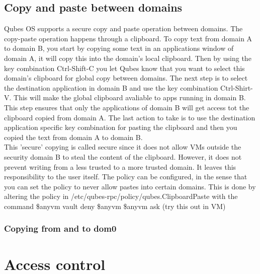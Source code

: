 \documentclass[runningheads,a4paper]{article}
\begin{document}
\subsection{Copy and paste between domains}
Qubes OS supports a secure copy and paste operation between domains. The copy-paste operation happens through a clipboard. To copy text from domain A to domain B, you start by copying some text in an applications window of domain A, it will copy this into the domain's local clipboard. Then by using the key combination Ctrl-Shift-C you let Qubes know that you want to select this domain's clipboard for global copy between domains. The next step is to select the destination application in domain B and use the key combination Ctrl-Shirt-V. This will make the global clipboard avaliable to apps running in domain B. This step ensures that only the applications of domain B will get access tot the clipboard copied from domain A. The last action to take is to use the destination application specific key combination for pasting the clipboard and then you copied the text from domain A to domain B.\\
This 'secure' copying is called secure since it does not allow VMs outside the security domain B to steal the content of the clipboard. However, it does not prevent writing from a less trusted to a more trusted domain. It leaves this responsibility to the user itself. The policy can be configured, in the sense that you can set the policy to never allow pastes into certain domains. This is done by altering the policy in /etc/qubes-rpc/policy/qubes.ClipboardPaste with the command \$anyvm  vault   deny
\$anyvm  \$anyvm  ask (try this out in VM)
\subsubsection{Copying from and to dom0}
\section{Access control}

%
%
\end{document}

